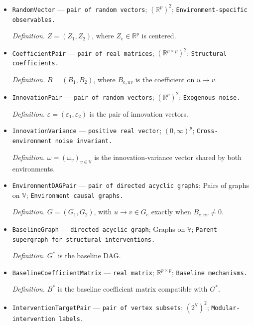 \documentclass{article}
\begin{document}
\begin{itemize}
  \par\smallskip\noindent\emph{Definition.} \(\lambda=\lim_{N\to\infty}n_1/N\).
  \item \texttt{RandomVector} --- \texttt{pair of random vectors}; \((\mathbb R^p)^2\); \texttt{Environment-\allowbreak{}specific observables.}
  \par\smallskip\noindent\emph{Definition.} \(Z=(Z_1,Z_2)\), where \(Z_e\in\mathbb R^p\) is centered.
  \item \texttt{CoefficientPair} --- \texttt{pair of real matrices}; \((\mathbb R^{p\times p})^2\); \texttt{Structural coefficients.}
  \par\smallskip\noindent\emph{Definition.} \(B=(B_1,B_2)\), where \(B_{e,uv}\) is the coefficient on \(u\to v\).
  \item \texttt{InnovationPair} --- \texttt{pair of random vectors}; \((\mathbb R^p)^2\); \texttt{Exogenous noise.}
  \par\smallskip\noindent\emph{Definition.} \(\varepsilon=(\varepsilon_1,\varepsilon_2)\) is the pair of innovation vectors.
  \item \texttt{InnovationVariance} --- \texttt{positive real vector}; \((0,\infty)^p\); \texttt{Cross-\allowbreak{}environment noise invariant.}
  \par\smallskip\noindent\emph{Definition.} \(\omega=(\omega_v)_{v\in\mathbb V}\) is the innovation-variance vector shared by both environments.
  \item \texttt{EnvironmentDAGPair} --- \texttt{pair of directed acyclic graphs}; Pairs of graphs on \(\mathbb V\); \texttt{Environment causal graphs.}
  \par\smallskip\noindent\emph{Definition.} \(G=(G_1,G_2)\), with \(u\to v\in G_e\) exactly when \(B_{e,uv}\neq0\).
  \item \texttt{BaselineGraph} --- \texttt{directed acyclic graph}; Graphs on \(\mathbb V\); \texttt{Parent supergraph for structural interventions.}
  \par\smallskip\noindent\emph{Definition.} \(G^*\) is the baseline DAG.
  \item \texttt{BaselineCoefficientMatrix} --- \texttt{real matrix}; \(\mathbb R^{p\times p}\); \texttt{Baseline mechanisms.}
  \par\smallskip\noindent\emph{Definition.} \(B^*\) is the baseline coefficient matrix compatible with \(G^*\).
  \item \texttt{InterventionTargetPair} --- \texttt{pair of vertex subsets}; \((2^{\mathbb V})^2\); \texttt{Modular-\allowbreak{}intervention labels.}

\end{itemize}
\end{document}
